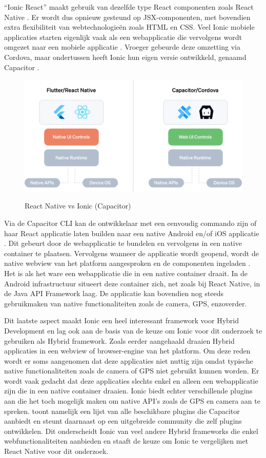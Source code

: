 ``Ionic React'' maakt gebruik van dezelfde type React componenten zoals React Native \autocite{Bron8}. Er wordt dus opnieuw gesteund op JSX-componenten, met bovendien extra flexibiliteit van webtechnologieën zoals HTML en CSS. Veel Ionic mobiele applicaties starten eigenlijk vaak als een webapplicatie die vervolgens wordt omgezet naar een mobiele applicatie \autocite{Bron19}. Vroeger gebeurde deze omzetting via Cordova, maar ondertussen heeft Ionic hun eigen versie ontwikkeld, genaamd Capacitor \autocite{Bron19}.

\begin{figure}
  \centering
  \includegraphics[width=0.9\linewidth]{img/ReactIonic}
  \caption{React Native vs Ionic (Capacitor)}
  \label{fig:React Native vs Ionic (Capacitor)} \autocite{Bron19IMG}
\end{figure}

Via de Capacitor CLI kan de ontwikkelaar met een eenvoudig commando zijn of haar React applicatie laten builden naar een native Android en/of iOS applicatie \autocite{Bron21}. Dit gebeurt door de webapplicatie te bundelen en vervolgens in een native container te plaatsen. Vervolgens wanneer de applicatie wordt geopend, wordt de native webview van het platform aangesproken en de componenten ingeladen \autocite{Bron19}. Het is als het ware een webapplicatie die in een native container draait. In de Android infrastructuur situeert deze container zich, net zoals bij React Native, in de Java API Framework laag. De applicatie kan bovendien nog steeds gebruikmaken van native functionaliteiten zoals de camera, GPS, enzoverder.

Dit laatste aspect maakt Ionic een heel interessant framework voor Hybrid Development en lag ook aan de basis van de keuze om Ionic voor dit onderzoek te gebruiken als Hybrid framework. Zoals eerder aangehaald draaien Hybrid applicaties in een webview of browser-engine van het platform. Om deze reden wordt er soms aangenomen dat deze applicaties niet nuttig zijn omdat typische native functionaliteiten zoals de camera of GPS niet gebruikt kunnen worden. Er wordt vaak gedacht dat deze applicaties slechts enkel en alleen een webapplicatie zijn die in een native container draaien. Ionic biedt echter verschillende plugins aan die het toch mogelijk maken om native API's zoals de GPS en camera aan te spreken. \textcite{Bron22} toont namelijk een lijst van alle beschikbare plugins die Capacitor aanbiedt en steunt daarnaast op een uitgebreide community die zelf plugins ontwikkelen. Dit onderscheidt Ionic van veel andere Hybrid frameworks die enkel webfunctionaliteiten aanbieden en staaft de keuze om Ionic te vergelijken met React Native voor dit onderzoek.

